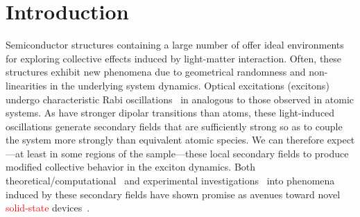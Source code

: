 \section{\label{section:introduction}Introduction}

Semiconductor structures containing a large number of \qds{} offer ideal environments for exploring   collective effects induced by light-matter interaction.
Often, these structures exhibit new phenomena due to geometrical randomness and non-linearities in the underlying system dynamics.
Optical excitations (excitons) undergo characteristic Rabi oscillations~\cite{Stievater2001,Kamada2001,Htoon2002} in \qds{} analogous to those observed in atomic systems.
As \qds{} have stronger dipolar transitions than atoms, these light-induced oscillations generate  secondary fields that are sufficiently strong so as to couple the system more strongly than equivalent atomic species. We can therefore expect---at least in some regions of the sample---these local secondary fields to produce modified collective behavior in the exciton dynamics.
Both theoretical/computational~\cite{Slepyan2002,Slepyan2004} and experimental investigations~\cite{Asakura2013} into phenomena induced by these secondary fields have shown promise as avenues toward novel \textcolor{red}{solid-state} devices~\cite{Noginov2005,Bertolotti2010}.

